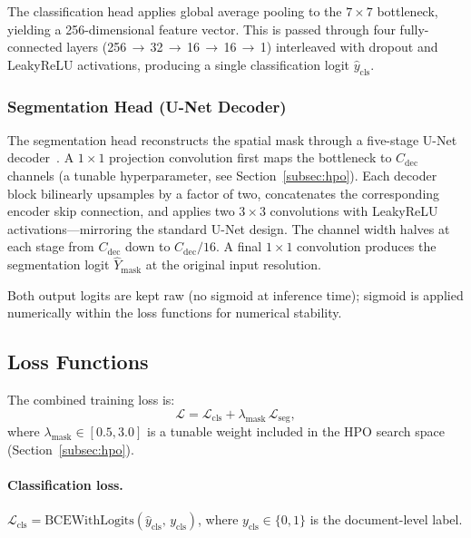 The classification head applies global average pooling to the $7 \times 7$
bottleneck, yielding a 256-dimensional feature vector. This is passed through
four fully-connected layers (256\,$\to$\,32\,$\to$\,16\,$\to$\,16\,$\to$\,1)
interleaved with dropout and LeakyReLU activations, producing a single
classification logit $\hat{y}_{\text{cls}}$.

\subsubsection{Segmentation Head (U-Net Decoder)}

The segmentation head reconstructs the spatial mask through a five-stage U-Net
decoder~\cite{unet2015}. A $1 \times 1$ projection convolution first maps the
bottleneck to $C_{\text{dec}}$ channels (a tunable hyperparameter, see
Section~\ref{subsec:hpo}). Each decoder block bilinearly upsamples by a factor of
two, concatenates the corresponding encoder skip connection, and applies two
$3 \times 3$ convolutions with LeakyReLU activations—mirroring the standard
U-Net design. The channel width halves at each stage from $C_{\text{dec}}$ down
to $C_{\text{dec}}/16$. A final $1 \times 1$ convolution produces the segmentation
logit $\hat{Y}_{\text{mask}}$ at the original input resolution.

Both output logits are kept raw (no sigmoid at inference time); sigmoid is applied
numerically within the loss functions for numerical stability.

\subsection{Loss Functions}
\label{subsec:loss}

The combined training loss is:
\begin{equation}
  \mathcal{L} = \mathcal{L}_{\text{cls}} + \lambda_{\text{mask}} \,
                \mathcal{L}_{\text{seg}},
  \label{eq:total_loss}
\end{equation}
where $\lambda_{\text{mask}} \in [0.5, 3.0]$ is a tunable weight included in the
HPO search space (Section~\ref{subsec:hpo}).

\paragraph{Classification loss.}
$\mathcal{L}_{\text{cls}} = \text{BCEWithLogits}(\hat{y}_{\text{cls}},\, y_{\text{cls}})$,
where $y_{\text{cls}} \in \{0, 1\}$ is the document-level label.

